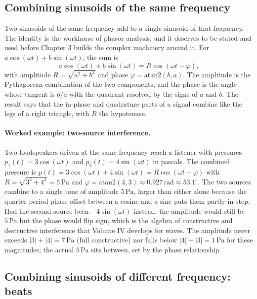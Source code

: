 \subsection{Combining sinusoids of the same frequency}

Two sinusoids of the same frequency add to a single sinusoid of that
frequency. The identity is the workhorse of phasor analysis, and it
deserves to be stated and used before Chapter 3 builds the complex
machinery around it. For $a \cos(\omega t) + b \sin(\omega t)$, the
sum is
\[
  a \cos(\omega t) + b \sin(\omega t)
  = R \cos(\omega t - \varphi),
\]
with amplitude $R = \sqrt{a^{2} + b^{2}}$ and phase $\varphi =
\mathrm{atan2}(b, a)$. The amplitude is the Pythagorean combination
of the two components, and the phase is the angle whose tangent is
$b/a$ with the quadrant resolved by the signs of $a$ and $b$. The
result says that the in-phase and quadrature parts of a signal
combine like the legs of a right triangle, with $R$ the hypotenuse.

\paragraph{Worked example: two-source interference.}
Two loudspeakers driven at the same frequency reach a listener with
pressures $p_{1}(t) = 3 \cos(\omega t)$ and $p_{2}(t) = 4
\sin(\omega t)$ in pascals. The combined pressure is $p(t) = 3
\cos(\omega t) + 4 \sin(\omega t) = R \cos(\omega t - \varphi)$ with
$R = \sqrt{3^{2} + 4^{2}} = 5\,\si{\pascal}$ and $\varphi =
\mathrm{atan2}(4, 3) \approx 0.927\,\si{\radian} \approx
53.1^{\circ}$. The two sources combine to a single tone of amplitude
$5\,\si{\pascal}$, larger than either alone because the
quarter-period phase offset between a cosine and a sine puts them
partly in step. Had the second source been $-4 \sin(\omega t)$
instead, the amplitude would still be $5\,\si{\pascal}$ but the phase
would flip sign, which is the algebra of constructive and destructive
interference that Volume IV develops for waves. The amplitude never
exceeds $|3| + |4| = 7\,\si{\pascal}$ (full constructive) nor falls
below $|4| - |3| = 1\,\si{\pascal}$ for these magnitudes; the actual
$5\,\si{\pascal}$ sits between, set by the phase relationship.

\subsection{Combining sinusoids of different frequency: beats}

